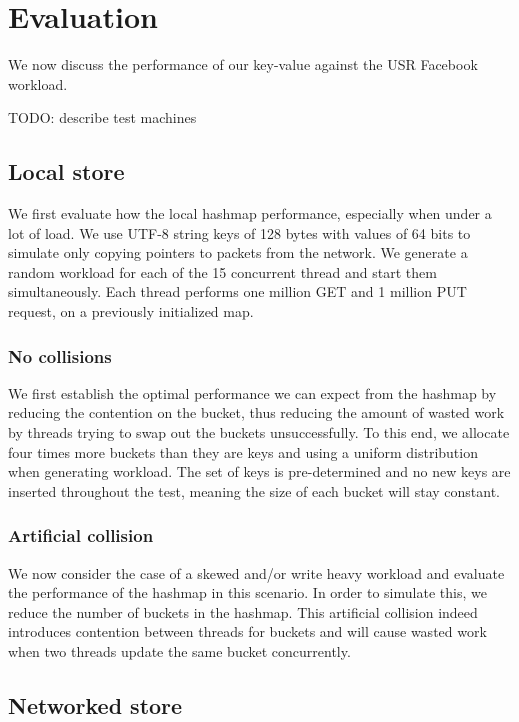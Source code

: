 \documentclass[11pt]{article}
\begin{document}
\section{Evaluation}

We now discuss the performance of our key-value against the USR
Facebook workload.

TODO: describe test machines

\subsection{Local store}

We first evaluate how the local hashmap performance, especially when
under a lot of load. We use UTF-8 string keys of 128 bytes with values
of 64 bits to simulate only copying pointers to packets from the
network. We generate a random workload for each of the 15 concurrent
thread and start them simultaneously. Each thread performs one million
GET and 1 million PUT request, on a previously initialized map.

\subsubsection{No collisions}

We first establish the optimal performance we can expect from the
hashmap by reducing the contention on the bucket, thus reducing the
amount of wasted work by threads trying to swap out the buckets
unsuccessfully. To this end, we allocate four times more buckets than
they are keys and using a uniform distribution when generating
workload. The set of keys is pre-determined and no new keys are
inserted throughout the test, meaning the size of each bucket will
stay constant.

\subsubsection{Artificial collision}

We now consider the case of a skewed and/or write heavy workload and
evaluate the performance of the hashmap in this scenario. In order to
simulate this, we reduce the number of buckets in the hashmap. This
artificial collision indeed introduces contention between threads for
buckets and will cause wasted work when two threads update the same
bucket concurrently.

\subsection{Networked store}
\end{document}
